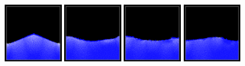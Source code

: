 \documentclass[12pt, A4]{article}
\begin{document}
\begin{figure}[h!]
  \centering
\includegraphics[width=0.23\textwidth]{semilag-state-a/img1}
\includegraphics[width=0.23\textwidth]{semilag-state-a/img2}
\includegraphics[width=0.23\textwidth]{semilag-state-a/img3}
\includegraphics[width=0.23\textwidth]{semilag-state-a/img4}


\end{figure}
\end{document}
